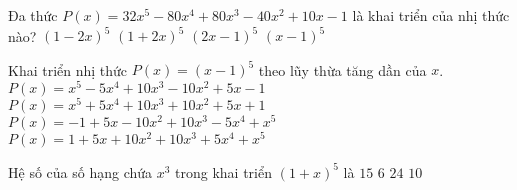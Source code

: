 \begin{ex}%
	Đa thức $P(x)=32x^5-80x^4+80x^3-40x^2+10x-1$ là khai triển của nhị thức nào?
	\choice
	{$(1-2x)^5$}
	{$(1+2x)^5$}
	{\True $(2x-1)^5$}
	{$(x-1)^5$}
\end{ex}


\begin{ex}%
	Khai triển nhị thức $P(x)=(x-1)^5$ theo lũy thừa tăng dần của $x$.
	\choice
	{$P(x)=x^5-5x^4+10x^3-10x^2+5x-1$}
	{$P(x)=x^5+5x^4+10x^3+10x^2+5x+1$}
	{\True $P(x)=-1+5x-10x^2+10x^3-5x^4+x^5$}
	{$P(x)=1+5x+10x^2+10x^3+5x^4+x^5$}
\end{ex}

\begin{ex}%
	Hệ số của số hạng chứa $x^3$ trong khai triển $(1+x)^5$ là
	\choice
	{$15$}
	{$6$}
	{$24$}
	{\True $10$}
\end{ex}




